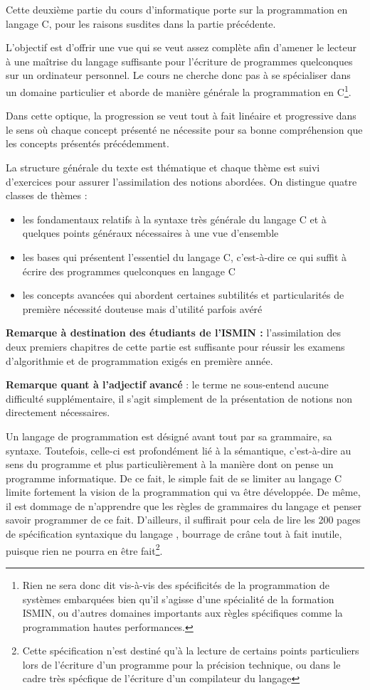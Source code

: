 \documentclass[../../main.tex]{subfiles}
\begin{document}
Cette deuxième partie du cours d'informatique porte sur la programmation en langage C, pour les raisons susdites dans la partie précédente.
 
L'objectif est d'offrir une vue qui se veut assez complète afin d'amener le lecteur à une maîtrise du langage suffisante pour l'écriture de programmes quelconques sur un ordinateur personnel. Le cours ne cherche donc pas à se spécialiser dans un domaine particulier et aborde de manière générale la programmation en C\footnote{Rien ne sera donc dit vis-à-vis des spécificités de la programmation de systèmes embarquées bien qu'il s'agisse d'une spécialité de la formation ISMIN, ou d'autres domaines importants aux règles spécifiques comme la programmation hautes performances.}.
 
Dans cette optique, la progression se veut tout à fait linéaire et progressive dans le sens où chaque concept présenté ne nécessite pour sa bonne compréhension que les concepts présentés précédemment.
 
La structure générale du texte est thématique et chaque thème est suivi d'exercices pour assurer l'assimilation des notions abordées. On distingue quatre classes de thèmes :
\begin{itemize}
	\item les fondamentaux relatifs à la syntaxe très générale du langage C et à quelques points généraux nécessaires à une vue d'ensemble
	\item les bases qui présentent l'essentiel du langage C, c'est-à-dire ce qui suffit à écrire des programmes quelconques en langage C
	\item les concepts avancées qui abordent certaines subtilités et particularités de première nécessité douteuse mais d'utilité parfois avéré
\end{itemize}
\textbf{Remarque à destination des étudiants de l'ISMIN : } l'assimilation des deux premiers chapitres de cette partie est suffisante pour réussir les examens d'algorithmie et de programmation exigés en première année.

\textbf{Remarque quant à l'adjectif \og avancé \fg} : le terme ne sous-entend aucune difficulté supplémentaire, il s'agit simplement de la présentation de notions non directement nécessaires.

Un langage de programmation est désigné avant tout par sa grammaire, sa syntaxe. Toutefois, celle-ci est profondément lié à la sémantique, c'est-à-dire au sens du programme et plus particulièrement à la manière dont on pense un programme informatique. De ce fait, le simple fait de se limiter au langage C limite fortement la vision de la programmation qui va être développée. De même, il est dommage de n'apprendre que les règles de grammaires du langage et penser savoir programmer de ce fait. D'ailleurs, il suffirait pour cela de lire les 200 pages de spécification syntaxique du langage \cite{c11}, bourrage de crâne tout à fait inutile, puisque rien ne pourra en être fait\footnote{Cette spécification n'est destiné qu'à la lecture de certains points particuliers lors de l'écriture d'un programme pour la précision technique, ou dans le cadre très spécfique de l'écriture d'un compilateur du langage}.
\end{document}
